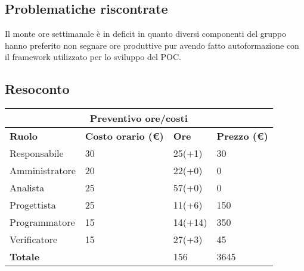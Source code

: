 \documentclass[12pt]{article}
\begin{document}
\subsection{Problematiche riscontrate}
Il monte ore settimanale è in deficit in quanto diversi componenti del gruppo hanno preferito non segnare ore produttive pur avendo fatto autoformazione con il framework utilizzato per lo sviluppo del POC.
\subsection{Resoconto}
\begin{center}
    \begin{tabularx}{\textwidth}{|X|X|X|X|}
        \hline
        \multicolumn{4}{|c|}{\textbf{Preventivo ore/costi}}\\
        \hline
        \hline
        \textbf{Ruolo} & \textbf{Costo orario (\euro)} & \textbf{Ore} & \textbf{Prezzo (\euro)}\\
        \hline
        Responsabile    & 30 & 25(+1)  & 30\\
        \hline
        Amministratore  & 20 & 22(+0)  & 0\\
        \hline
        Analista        & 25 & 57(+0)  & 0\\
        \hline
        Progettista     & 25 & 11(+6)  & 150\\
        \hline
        Programmatore   & 15 & 14(+14)  & 350\\
        \hline
        Verificatore    & 15 & 27(+3)  & 45\\
        \hline
        \hline
        \textbf{Totale} &    & 156 &  3645 \\
        \hline
    \end{tabularx}\\[8pt]
    \mbox{}\\
\end{center}
\end{document}
